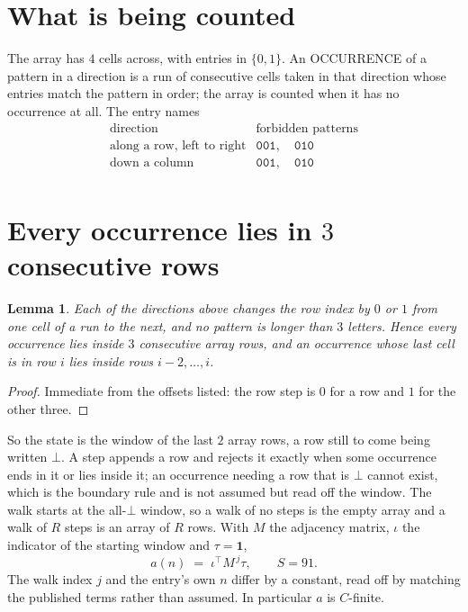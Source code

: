 \documentclass[11pt,a4paper]{article}
\theoremstyle{plain}
\newtheorem{lemma}[theorem]{Lemma}
\theoremstyle{definition}
\begin{document}
\section{What is being counted}

The array has $4$ cells across, with entries in $\{0,1\}$. An OCCURRENCE of a pattern in a
direction is a run of consecutive cells taken in that direction whose entries match the pattern
in order; the array is counted when it has no occurrence at all. The entry names
\[
\begin{array}{ll}
\text{direction} & \text{forbidden patterns} \\[2pt]
\text{along a row, left to right} & \mathtt{001},\quad \mathtt{010} \\
\text{down a column} & \mathtt{001},\quad \mathtt{010} \\
\end{array}
\]


\section{Every occurrence lies in $3$ consecutive rows}

\begin{lemma}\label{lem:win}
Each of the directions above changes the row index by $0$ or $1$ from one cell of a run to the
next, and no pattern is longer than $3$ letters. Hence every occurrence lies inside $3$
consecutive array rows, and an occurrence whose last cell is in row $i$ lies inside rows
$i-2,\dots,i$.
\end{lemma}

\begin{proof}
Immediate from the offsets listed: the row step is $0$ for a row and $1$ for the other three.
\end{proof}

So the state is the window of the last $2$ array rows, a row still to come being written
$\bot$. A step appends a row and rejects it exactly when some occurrence ends in it or lies
inside it; an occurrence needing a row that is $\bot$ cannot exist, which is the boundary rule
and is not assumed but read off the window. The walk starts at the all-$\bot$ window, so a walk
of no steps is the empty array and a walk of $R$ steps is an array of $R$ rows. With $M$ the
adjacency matrix, $\iota$ the indicator of the starting window and $\tau=\mathbf{1}$,
\[
a(n)\;=\;\iota^{\!\top}M^{\,j}\tau ,\qquad S=91.
\]
The walk index $j$ and the entry's own $n$ differ by a constant, read off by matching the
published terms rather than assumed. In particular $a$ is $C$-finite.
\end{document}
